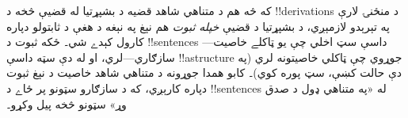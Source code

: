 \documentclass[../../../include/open-logic-section]{subfiles}
\begin{document}
که څه هم د متناهي شاهد قضيه د بشپړتيا له قضيې څخه د
!!{derivation}s د منځنۍ لارې په تېرېدو لازمېږي، د بشپړتيا د قضيې
\emph{خپله ثبوت} هم نېغ په نېغه د هغې د ثابتولو دپاره کارول کېدے
شي۔ ځکه ثبوت د !!{sentence}s داسې سټ اخلي چې يو ټاکلے خاصيت---
سازګاري---لري، او له دې سټه داسې !!a{structure} جوړوي چې ټاکلي
خاصيتونه لري (په دې حالت کښې، سټ پوره کوي)۔ کابو همدا جوړونه د
متناهي شاهد خاصيت د نېغ ثبوت دپاره کارېږي، که د سازګارو سټونو پر
ځاے د !!{sentence}s له «په متناهي ډول د صدق وړ» سټونو څخه پيل
وکړو۔
\end{document}
